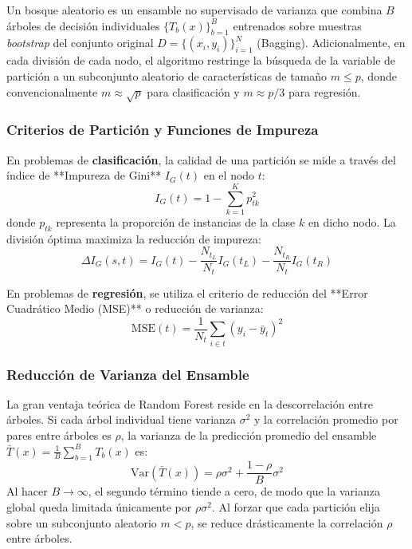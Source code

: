 \documentclass[12pt,letterpaper]{article}
\begin{document}
Un bosque aleatorio es un ensamble no supervisado de varianza que combina $B$ árboles de decisión individuales $\{T_b(x)\}_{b=1}^B$ entrenados sobre muestras \textit{bootstrap} del conjunto original $D = \{(x_i, y_i)\}_{i=1}^N$ (Bagging). Adicionalmente, en cada división de cada nodo, el algoritmo restringe la búsqueda de la variable de partición a un subconjunto aleatorio de características de tamaño $m \le p$, donde convencionalmente $m \approx \sqrt{p}$ para clasificación y $m \approx p/3$ para regresión.

\subsubsection{Criterios de Partición y Funciones de Impureza}
En problemas de \textbf{clasificación}, la calidad de una partición se mide a través del índice de **Impureza de Gini** $I_G(t)$ en el nodo $t$:
\begin{equation}
    I_G(t) = 1 - \sum_{k=1}^K p_{tk}^2
\end{equation}
donde $p_{tk}$ representa la proporción de instancias de la clase $k$ en dicho nodo. La división óptima maximiza la reducción de impureza:
\begin{equation}
    \Delta I_G(s, t) = I_G(t) - \frac{N_{t_L}}{N_t} I_G(t_L) - \frac{N_{t_R}}{N_t} I_G(t_R)
\end{equation}

En problemas de \textbf{regresión}, se utiliza el criterio de reducción del **Error Cuadrático Medio (MSE)** o reducción de varianza:
\begin{equation}
    \text{MSE}(t) = \frac{1}{N_t} \sum_{i \in t} (y_i - \bar{y}_t)^2
\end{equation}

\subsubsection{Reducción de Varianza del Ensamble}
La gran ventaja teórica de Random Forest reside en la descorrelación entre árboles. Si cada árbol individual tiene varianza $\sigma^2$ y la correlación promedio por pares entre árboles es $\rho$, la varianza de la predicción promedio del ensamble $\bar{T}(x) = \frac{1}{B}\sum_{b=1}^B T_b(x)$ es:
\begin{equation}
    \text{Var}(\bar{T}(x)) = \rho \sigma^2 + \frac{1 - \rho}{B} \sigma^2
\end{equation}
Al hacer $B \to \infty$, el segundo término tiende a cero, de modo que la varianza global queda limitada únicamente por $\rho \sigma^2$. Al forzar que cada partición elija sobre un subconjunto aleatorio $m < p$, se reduce drásticamente la correlación $\rho$ entre árboles.
\end{document}
